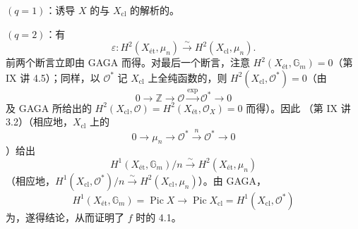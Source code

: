 $(q=1)$：诱导 $X$ 的与 $X_{\mathrm{cl}}$ 的解析的。

$(q=2)$：有
\[
\varepsilon:H^2(X_{\text{ét}},\mu_n)\xrightarrow{\sim}H^2(X_{\mathrm{cl}},\mu_n).
\]
前两个断言立即由 GAGA 而得。对最后一个断言，注意 $H^2(X_{\text{ét}},\mathbb G_m)=0$（第 IX 讲 4.5）；同样，以 $\mathcal O^*$ 记
$X_{\mathrm{cl}}$ 上全纯函数的，则 $H^2(X_{\mathrm{cl}},\mathcal O^*)=0$（由
\[
0\longrightarrow\mathbb Z\longrightarrow\mathcal O\xrightarrow{\exp}\mathcal O^*\longrightarrow0
\]
及 GAGA 所给出的 $H^2(X_{\mathrm{cl}},\mathcal O)=H^2(X_{\text{ét}},\mathcal O_X)=0$ 而得）。因此 （第 IX 讲 3.2）（相应地，$X_{\mathrm{cl}}$ 上的
\[
0\longrightarrow\mu_n\longrightarrow\mathcal O^*\xrightarrow{n}\mathcal O^*\longrightarrow0
\]
）给出
\[
H^1(X_{\text{ét}},\mathbb G_m)/n\xrightarrow{\sim}H^2(X_{\text{ét}},\mu_n)
\]
（相应地，$H^1(X_{\mathrm{cl}},\mathcal O^*)/n\xrightarrow{\sim}H^2(X_{\mathrm{cl}},\mu_n)$）。由 GAGA，
\[
H^1(X_{\text{ét}},\mathbb G_m)=\operatorname{Pic}X\longrightarrow\operatorname{Pic}X_{\mathrm{cl}}=H^1(X_{\mathrm{cl}},\mathcal O^*)
\]
为，遂得结论，从而证明了 $f$ 时的 4.1。

